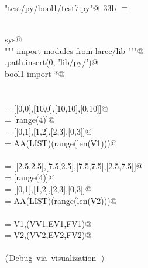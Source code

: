\documentclass[11pt,oneside]{article}	%
\begin{document}
\begin{flushleft} \small \label{scrap41}
\protect{}\verb@"test/py/bool1/test7.py"@\nobreak\ {\footnotesize 33b }$\equiv$
\vspace{-1ex}
\begin{list}{}{} \item
\mbox{}\verb@@\\
\mbox{}\verb@import sys@\\
\mbox{}\verb@""" import modules from larcc/lib """@\\
\mbox{}\verb@sys.path.insert(0, 'lib/py/')@\\
\mbox{}\verb@from bool1 import *@\\
\mbox{}\verb@@\\
\mbox{}\verb@@\\
\mbox{} = [[0,0],[10,0],[10,10],[0,10]]@\\
\mbox{} = [range(4)]@\\
\mbox{} = [[0,1],[1,2],[2,3],[0,3]]@\\
\mbox{} = AA(LIST)(range(len(V1)))@\\
\mbox{}\verb@@\\
\mbox{} = [[2.5,2.5],[7.5,2.5],[7.5,7.5],[2.5,7.5]]@\\
\mbox{} = [range(4)]@\\
\mbox{} = [[0,1],[1,2],[2,3],[0,3]]@\\
\mbox{} = AA(LIST)(range(len(V2)))@\\
\mbox{}\verb@@\\
\mbox{} = V1,(VV1,EV1,FV1)@\\
\mbox{} = V2,(VV2,EV2,FV2)@\\
\mbox{}\verb@@\\
\mbox{}\verb@@\hbox{$\langle\,$Debug via visualization\nobreak\ {\footnotesize {}}$\,\rangle$}\verb@@\\
\mbox{}\verb@@{\NWsep}
\end{list}
\vspace{-2ex}
\end{flushleft}
\end{document}
